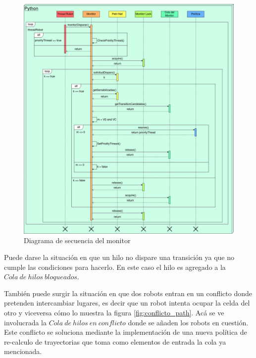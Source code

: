 \begin{figure}[H]
    \centering
    \hspace*{-0,8cm}
    \includegraphics[width=1.2\linewidth]{images/diagrama_monitor.jpg}
    \caption{Diagrama de secuencia del monitor}
    \label{fig:diagrama_monitor}
\end{figure}

Puede darse la situación en que un hilo no dispare una transición ya que no cumple las condiciones para hacerlo. En este caso el hilo es agregado a la $Cola\ de\ hilos\ bloqueados$.

También puede surgir la situación en que dos robots entran en un conflicto donde pretenden intercambiar lugares, es decir que un robot intenta ocupar la celda del otro y viceversa cómo lo muestra la figura \ref{fig:conflicto_path}. Acá se ve involucrada la $Cola\ de\ hilos\ en\ conflicto$ donde se añaden los robots en cuestión. Este conflicto se soluciona mediante la implementación de una nueva política de re-calculo de trayectorias que toma como elementos de entrada la cola ya mencionada.

